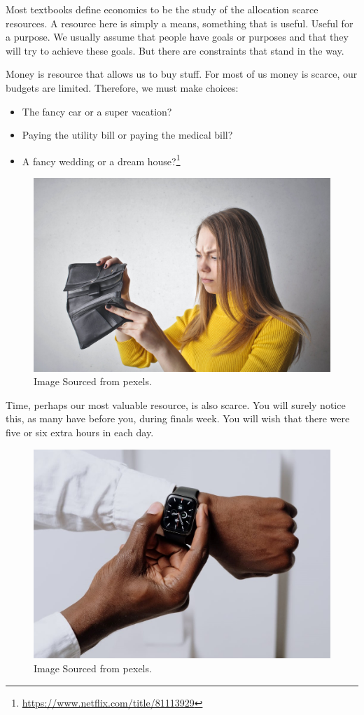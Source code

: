 \documentclass[
]{book}
\providecommand{\tightlist}{%
  \setlength{\itemsep}{0pt}\setlength{\parskip}{0pt}}
\begin{document}
Most textbooks define economics to be the study of the allocation scarce resources. A resource here is simply a means, something that is useful. Useful for a purpose. We usually assume that people have goals or purposes and that they will try to achieve these goals. But there are constraints that stand in the way.

Money is resource that allows us to buy stuff. For most of us money is scarce, our budgets are limited. Therefore, we must make choices:

\begin{itemize}
\tightlist
\item
  The fancy car or a super vacation?
\item
  Paying the utility bill or paying the medical bill?
\item
  A fancy wedding or a dream house?\footnote{\url{https://www.netflix.com/title/81113929}}
\end{itemize}

\begin{figure}

{\centering \includegraphics[width=0.6\linewidth]{img/intro/emptywallet} 

}

\caption{Image Sourced from pexels.}\label{fig:introemptywallet}
\end{figure}

Time, perhaps our most valuable resource, is also scarce. You will surely notice this, as many have before you, during finals week. You will wish that there were five or six extra hours in each day.

\begin{figure}

{\centering \includegraphics[width=0.6\linewidth]{img/intro/time} 

}

\caption{Image Sourced from pexels.}\label{fig:introtime}
\end{figure}
\end{document}
